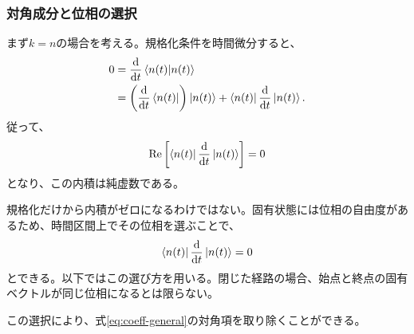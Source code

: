 \documentclass[a4paper,10.5pt]{article}
\numberwithin{equation}{section}
\begin{document}
\subsubsection{対角成分と位相の選択}
まず$k=n$の場合を考える。規格化条件を時間微分すると、
\begin{align}
0&=\frac{\dd}{\dd t}\braket{n(t)}{n(t)}\notag\\
&=\left(\frac{\dd}{\dd t}\bra{n(t)}\right)\ket{n(t)}
+\bra{n(t)}\frac{\dd}{\dd t}\ket{n(t)}.
\end{align}
従って、
\begin{align}
\operatorname{Re}\left[
\bra{n(t)}\frac{\dd}{\dd t}\ket{n(t)}
\right]=0
\end{align}
となり、この内積は純虚数である。
\begin{remarkbox}
規格化だけから内積がゼロになるわけではない。固有状態には位相の自由度があるため、時間区間上でその位相を選ぶことで、
\begin{align}
\bra{n(t)}\frac{\dd}{\dd t}\ket{n(t)}=0
\label{eq:parallel}
\end{align}
とできる。以下ではこの選び方を用いる。閉じた経路の場合、始点と終点の固有ベクトルが同じ位相になるとは限らない。
\end{remarkbox}
この選択により、式\eqref{eq:coeff-general}の対角項を取り除くことができる。
\end{document}
